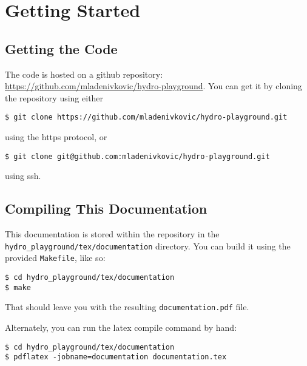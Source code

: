 \newpage
\section{Getting Started}



\subsection{Getting the Code}


The code is hosted on a github repository:
\url{https://github.com/mladenivkovic/hydro-playground}. You can get it by
cloning the repository using either

\begin{lstlisting}
$ git clone https://github.com/mladenivkovic/hydro-playground.git
\end{lstlisting}


using the https protocol, or

\begin{lstlisting}
$ git clone git@github.com:mladenivkovic/hydro-playground.git
\end{lstlisting}

using ssh.






\subsection{Compiling This Documentation}


This documentation is stored within the repository in the
\verb|hydro_playground/tex/documentation| directory. You can build it using the
provided \verb|Makefile|, like so:


\begin{lstlisting}
$ cd hydro_playground/tex/documentation
$ make
\end{lstlisting}

That should leave you with the resulting \verb|documentation.pdf| file.

Alternately, you can run the latex compile command by hand:

\begin{lstlisting}
$ cd hydro_playground/tex/documentation
$ pdflatex -jobname=documentation documentation.tex
\end{lstlisting}

